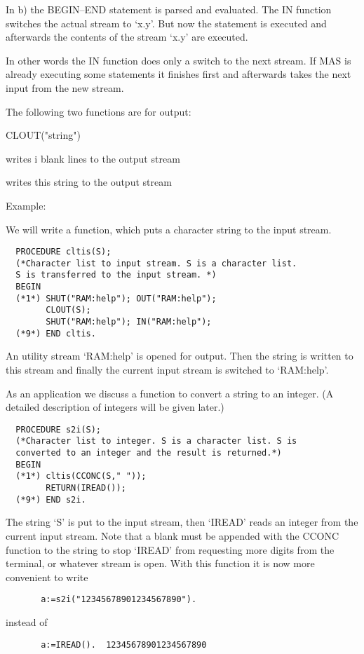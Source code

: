 In b) the BEGIN--END statement is
parsed and evaluated. The IN function switches the 
actual stream to `x.y'. 
But now the statement is executed and afterwards the
contents of the stream `x.y' are executed.

In other words the IN function does only a switch
to the next stream. If MAS is already executing
some statements it finishes first and 
afterwards takes the next input from
the new stream. 

The following two functions are for output:
\begin{deflist}{CLOUT("string")}
\item[BLINES(i)]        writes i blank lines to the output stream
\item[CLOUT("string")]  writes this string to the output stream
\end{deflist}


Example:

We will write a function, which puts a character string
to the input stream.
\begin{verbatim}
  PROCEDURE cltis(S);
  (*Character list to input stream. S is a character list.
  S is transferred to the input stream. *)
  BEGIN
  (*1*) SHUT("RAM:help"); OUT("RAM:help");
        CLOUT(S);
        SHUT("RAM:help"); IN("RAM:help");
  (*9*) END cltis.
\end{verbatim}
An utility stream `RAM:help' is opened for output.
Then the string is written to this stream and finally
the current input stream is switched to `RAM:help'.

As an application we discuss a function to convert
a string to an integer. 
(A detailed description of integers will be given later.)
\begin{verbatim}
  PROCEDURE s2i(S);
  (*Character list to integer. S is a character list. S is
  converted to an integer and the result is returned.*)
  BEGIN
  (*1*) cltis(CCONC(S," ")); 
        RETURN(IREAD());
  (*9*) END s2i.
\end{verbatim}
The string `S' is put to the input stream, then 
`IREAD' reads an integer from the current input stream.
Note that a blank must be appended 
with the CCONC function to the string to 
stop `IREAD' from requesting more digits from 
the terminal, or whatever stream is open.
With this function it is now more convenient to write
\begin{verbatim}
       a:=s2i("12345678901234567890").
\end{verbatim}
instead of
\begin{verbatim}
       a:=IREAD().  12345678901234567890 
\end{verbatim}


